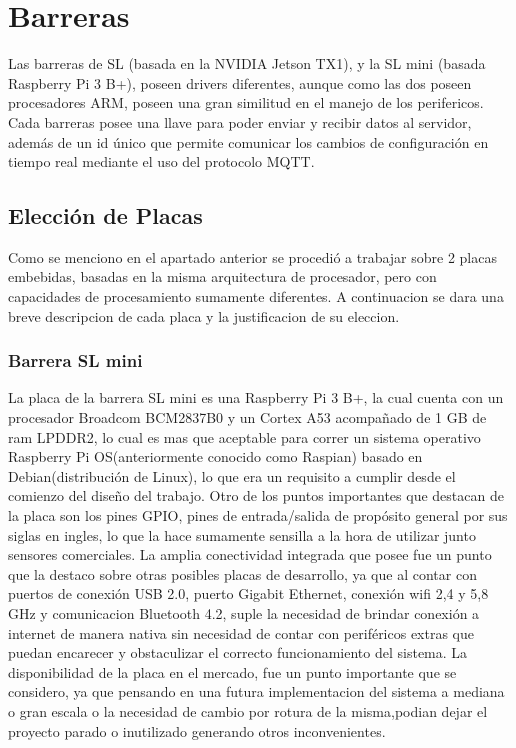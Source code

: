 \section{Barreras}

Las barreras de SL (basada en la NVIDIA Jetson TX1), y la SL mini (basada Raspberry Pi 3 B+), poseen drivers diferentes, aunque como las dos poseen procesadores ARM, poseen una gran similitud en el manejo de los perifericos. Cada barreras posee una llave para poder enviar y recibir datos al servidor, además de un id único que permite comunicar los cambios de configuración en tiempo real mediante el uso del protocolo MQTT.

\subsection{Elección de Placas}

Como se menciono en el apartado anterior se procedió a trabajar sobre 2 placas embebidas, basadas en la misma arquitectura de procesador, pero con capacidades de procesamiento sumamente diferentes. A continuacion se dara una breve descripcion de cada placa y la justificacion de su eleccion.
\subsubsection{Barrera SL mini}
La placa de la barrera SL mini es una Raspberry Pi 3 B+, la cual cuenta con un procesador Broadcom BCM2837B0 y un Cortex A53 acompañado de 1 GB de ram LPDDR2, lo cual es mas que aceptable para correr un sistema operativo Raspberry Pi OS(anteriormente conocido como Raspian) basado en Debian(distribución de Linux), lo que era un requisito a cumplir desde el comienzo del diseño del trabajo.
Otro de los puntos importantes que destacan de la placa son los pines GPIO, pines de entrada/salida de propósito general por sus siglas en ingles, lo que la hace sumamente sensilla a la hora de utilizar  junto sensores comerciales.
La amplia conectividad integrada que posee fue un punto que la destaco sobre otras posibles placas de desarrollo, ya que al contar con puertos de conexión USB 2.0, puerto Gigabit Ethernet, conexión wifi 2,4 y 5,8 GHz y comunicacion Bluetooth 4.2, suple la necesidad de brindar conexión a internet de manera nativa sin necesidad de contar con periféricos extras que puedan encarecer y obstaculizar el correcto funcionamiento del sistema.
La disponibilidad de la placa en el mercado, fue un punto importante que se considero, ya que pensando en una futura implementacion del sistema a mediana o gran escala o la necesidad de cambio por rotura de la misma,podian dejar el proyecto parado o inutilizado generando otros inconvenientes.
